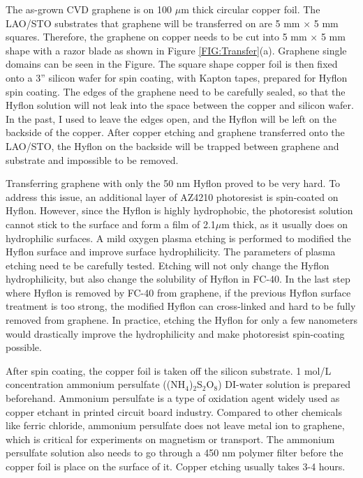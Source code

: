 \documentclass[pdflatex, sectionletters, 12pt]{pittetd}    %
\begin{document}
The as-grown CVD graphene is on 100 $\mu$m thick circular copper foil. The LAO/STO substrates that graphene will be transferred on are 5 mm $\times$ 5 mm squares. Therefore, the graphene on copper needs to be cut into 5 mm $\times$ 5 mm shape with a razor blade as shown in Figure \ref{FIG:Transfer}(a). Graphene single domains can be seen in the Figure. The square shape copper foil is then fixed onto a 3'' silicon wafer for spin coating, with Kapton tapes, prepared for Hyflon spin coating. The edges of the graphene need to be carefully sealed, so that the Hyflon solution will not leak into the space between the copper and silicon wafer. In the past, I used to leave the edges open, and the Hyflon will be left on the backside of the copper. After copper etching and graphene transferred onto the LAO/STO, the Hyflon on the backside will be trapped between graphene and substrate and impossible to be removed.

Transferring graphene with only the 50 nm Hyflon proved to be very hard. To address this issue, an additional layer of AZ4210 photoresist is spin-coated on Hyflon. However, since the Hyflon is highly hydrophobic, the photoresist solution cannot stick to the surface and form a film of 2.1$\mu$m thick, as it usually does on hydrophilic surfaces. A mild oxygen plasma etching is performed to modified the Hyflon surface and improve surface hydrophilicity. The parameters of plasma etching need te be carefully tested. Etching will not only change the Hyflon hydrophilicity, but also change the solubility of Hyflon in FC-40. In the last step where Hyflon is removed by FC-40 from graphene, if the previous Hyflon surface treatment is too strong, the modified Hyflon can cross-linked and hard to be fully removed from graphene. In practice, etching the Hyflon for only a few nanometers would drastically improve the hydrophilicity and make photoresist spin-coating possible.

After spin coating, the copper foil is taken off the silicon substrate. 1 mol/L concentration ammonium persulfate ((NH$_4$)$_2$S$_2$O$_8$) DI-water solution is prepared beforehand. Ammonium persulfate is a type of oxidation agent widely used as copper etchant in printed circuit board industry. Compared to other chemicals like ferric chloride, ammonium persulfate does not leave metal ion to graphene, which is critical for experiments on magnetism or transport. The ammonium persulfate solution also needs to go through a 450 nm polymer filter before the copper foil is place on the surface of it. Copper etching usually takes 3-4 hours. 
\end{document}

